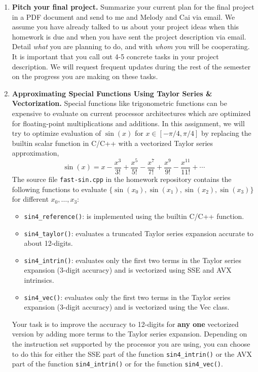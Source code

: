 \documentclass[12pt]{article}
\begin{document}
\begin{enumerate}
\item {\bf Pitch your final project.}  Summarize your current plan for
 the final project in a PDF document and send to me and Melody and Cai via email. We assume you have
 already talked to us about your project ideas when this homework is due and when you have sent the project description via email.  Detail \emph{what} you are planning to do, and
 with \emph{whom} you will be cooperating. 
It is important that you call out 4-5 concrete tasks in your project description.  We will request
 frequent updates during the rest of the semester on the progress you are making on these tasks.

  \item {\bf Approximating Special Functions Using Taylor Series \& Vectorization.}
    Special functions like trigonometric functions can be expensive to
    evaluate on current processor architectures which are optimized for
    floating-point multiplications and additions. In this assignment, we
    will try to optimize evaluation of $\sin(x)$ for $x\in[-\pi/4,
    \pi/4]$ by replacing the builtin scalar function in C/C++ with a
    vectorized Taylor series approximation,
    \[
      \sin(x) = x - \frac{x^3}{3!} + \frac{x^5}{5!} - \frac{x^7}{7!} + \frac{x^9}{9!} - \frac{x^{11}}{11!} + \cdots
    \]
    The source file \texttt{fast-sin.cpp} in the homework repository
    contains the following functions to evaluate $\{\sin(x_0),
    \sin(x_1), \sin(x_2), \sin(x_3)\}$ for different $x_0,\ldots,x_3$:
    \begin{itemize}
      \item \texttt{sin4\_reference()}: is implemented using the builtin C/C++ function.
      \item \texttt{sin4\_taylor()}: evaluates a truncated Taylor series expansion accurate to about 12-digits.
      \item \texttt{sin4\_intrin()}: evaluates only the first two
        terms in the Taylor series expansion (3-digit accuracy) and
        is vectorized using SSE and AVX intrinsics.
      \item \texttt{sin4\_vec()}: evaluates only the first two terms
        in the Taylor series expansion (3-digit accuracy) and
        is vectorized using the Vec class.
    \end{itemize}
    Your task is to improve the accuracy to 12-digits for {\bf any one}
    vectorized version by adding more terms to the Taylor series
    expansion.  Depending on the instruction set supported by the
    processor you are using, you can choose to do this for either the
    SSE part of the function \texttt{sin4\_intrin()} or the AVX part of
    the function \texttt{sin4\_intrin()} or for the function
    \texttt{sin4\_vec()}.


\end{enumerate}
\end{document}
